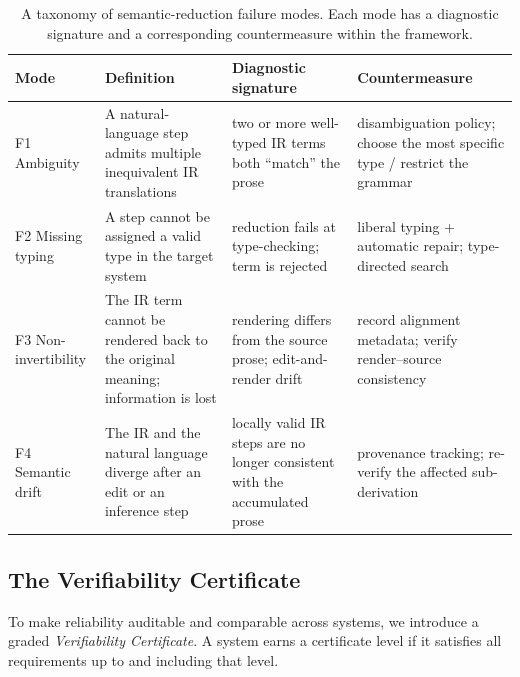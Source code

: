 \documentclass[11pt,a4paper]{article}
\theoremstyle{definition}
\theoremstyle{plain}
\begin{document}
\begin{table}[t]
\centering
\caption{A taxonomy of semantic-reduction failure modes. Each mode has a diagnostic signature and a
corresponding countermeasure within the framework.}
\label{tab:taxonomy}
\small
\begin{tabular}{@{}p{2.1cm}p{3.6cm}p{4.6cm}p{3.4cm}@{}}
\toprule
\textbf{Mode} & \textbf{Definition} & \textbf{Diagnostic signature} & \textbf{Countermeasure}\\
\midrule
F1 Ambiguity & A natural-language step admits multiple inequivalent IR translations & two or more well-typed
IR terms both ``match'' the prose & disambiguation policy; choose the most specific type / restrict the
grammar\\
F2 Missing typing & A step cannot be assigned a valid type in the target system & reduction fails at
type-checking; term is rejected & liberal typing + automatic repair; type-directed search\\
F3 Non-invertibility & The IR term cannot be rendered back to the original meaning; information is lost &
rendering differs from the source prose; edit-and-render drift & record alignment metadata; verify
render--source consistency\\
F4 Semantic drift & The IR and the natural language diverge after an edit or an inference step &
locally valid IR steps are no longer consistent with the accumulated prose & provenance tracking;
re-verify the affected sub-derivation\\
\bottomrule
\end{tabular}
\end{table}

\subsection{The Verifiability Certificate}
\label{sec:certificate}

To make reliability auditable and comparable across systems, we introduce a graded
\emph{Verifiability Certificate}. A system earns a certificate level if it satisfies all requirements up
to and including that level.
\end{document}
